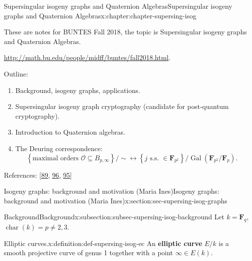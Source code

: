 \documentclass[oneside,10pt,]{book}
\newcommand{\terminology}[1]{\textbf{#1}}
\numberwithin{equation}{section}
\newcommand{\FF}{\mathbf{F}}
\newcommand{\ints}{\mathcal{O}}
\DeclareMathOperator{\characteristic}{char}
\newcommand{\Gal}[2]{\operatorname{Gal}(#1/#2)}
\begin{document}
\begin{chapterptx}{Supersingular isogeny graphs and Quaternion Algebras}{}{Supersingular isogeny graphs and Quaternion Algebras}{}{}{x:chapter:chapter-supersing-isog}
\begin{introduction}{}%
These are notes for BUNTES Fall 2018, the topic is Supersingular isogeny graphs and Quaternion Algebras.%
\par
\url{http://math.bu.edu/people/midff/buntes/fall2018.html}.%
\par
Outline:%
\begin{enumerate}
\item{}Background, isogeny graphs, applications.%
\item{}Supersingular isogeny graph cryptography (candidate for post-quantum cryptography).%
\item{}Introduction to Quaternion algebras.%
\item{}The Deuring correspondence:%
\begin{equation*}
\left\{ \text{maximal orders }\ints \subseteq B_{p,\infty}\right\}/\sim \leftrightarrow \left\{ j \text{ s.s. }\in \FF_{p^2}\right\}/\Gal{\FF_{p^2}}{\FF_p}\text{.}
\end{equation*}
%
\end{enumerate}
%
\par
References: [\hyperlink{x:biblio:bib-sutherland}{89}, \hyperlink{x:biblio:bib-voight-quat}{96}, \hyperlink{x:biblio:bib-velu}{95}]%
\end{introduction}%
%
%
\typeout{************************************************}
\typeout{************************************************}
%
\begin{sectionptx}{Isogeny graphs: background and motivation (Maria Ines)}{}{Isogeny graphs: background and motivation (Maria Ines)}{}{}{x:section:sec-supersing-isog-graphs}
%
%
\typeout{************************************************}
\typeout{************************************************}
%
\begin{subsectionptx}{Background}{}{Background}{}{}{x:subsection:subsec-supersing-isog-background}
Let \(k = \FF_q\), \(\characteristic (k) = p \ne 2,3\).%
\begin{definition}{Elliptic curves.}{x:definition:def-supersing-isog-ec}%
An \terminology{elliptic curve} \(E/k\) is a smooth projective curve of genus 1 together with a point \(\infty \in E(k)\).%
\end{definition}

\end{subsectionptx}
\end{sectionptx}
\end{chapterptx}
\end{document}

